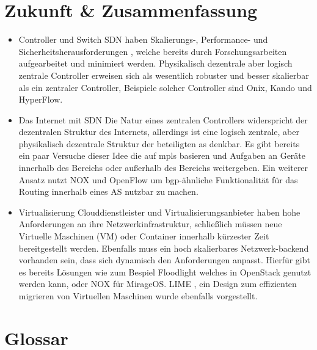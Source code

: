 \documentclass[twoside,12pt]{scrartcl}
\begin{document}
\section{Zukunft \& Zusammenfassung}
\begin{itemize}
	\item Controller und Switch
	SDN haben Skalierungs-, Performance- und Sicherheitsherausforderungen \cite{6739370}, welche bereits durch Forschungsarbeiten aufgearbeitet und minimiert werden. Physikalisch dezentrale aber logisch zentrale Controller erweisen sich als wesentlich robuster und besser skalierbar als ein zentraler Controller, Beispiele solcher Controller sind Onix, Kando und HyperFlow.
	\item Das Internet mit SDN
	Die Natur eines zentralen Controllers widerspricht der dezentralen Struktur des Internets, allerdings ist eine logisch zentrale, aber physikalisch dezentrale Struktur der beteiligten \gls{as} denkbar. Es gibt bereits ein paar Versuche dieser Idee die auf \gls{mpls} basieren und Aufgaben an Geräte innerhalb des Bereichs oder außerhalb des Bereichs weitergeben. Ein weiterer Ansatz nutzt NOX und OpenFlow  um \gls{bgp}-ähnliche Funktionalität für das Routing innerhalb eines AS nutzbar zu machen.
	\item Virtualisierung
	Clouddienstleister und Virtualisierungsanbieter haben hohe Anforderungen an ihre Netzwerkinfrastruktur, schließlich müssen neue Virtuelle Maschinen (VM) oder Container innerhalb kürzester Zeit bereitgestellt werden. Ebenfalls muss ein hoch skalierbares Netzwerk-backend vorhanden sein, dass sich dynamisch den Anforderungen anpasst. Hierfür gibt es bereits Lösungen wie zum Bespiel Floodlight welches in OpenStack genutzt werden kann, oder NOX für MirageOS. LIME \cite{lime}, ein Design zum effizienten migrieren von Virtuellen Maschinen wurde ebenfalls vorgestellt.
\end{itemize}
\newpage
\section{Glossar}
	\listoffigures
	
	\printglossary[style=altlist,title=Glossar]
	
				
	 
	
\end{document}
